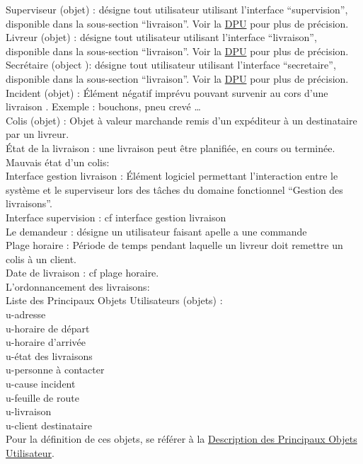 \documentclass{report}
\begin{document}
\begin{appendices}
Superviseur (objet) : désigne tout utilisateur utilisant l’interface “supervision”, disponible dans la sous-section “livraison”. Voir la \hyperlink{labDPUSup}{DPU} pour plus de précision.\\

Livreur (objet) : désigne tout utilisateur utilisant l’interface “livraison”, disponible dans la sous-section “livraison”. Voir la \hyperlink{labDPULiv}{DPU} pour plus de précision.\\

Secrétaire (object ): désigne tout utilisateur utilisant l’interface “secretaire”, disponible dans la sous-section “livraison”. Voir la \hyperlink{labDPUSec}{DPU} pour plus de précision.\\

Incident (objet) : Élément négatif imprévu pouvant survenir au cors d’une livraison . Exemple : bouchons, pneu crevé …\\

Colis (objet) : Objet à valeur marchande remis d’un expéditeur à un destinataire par un livreur.\\

État de la livraison : une livraison peut être planifiée, en cours ou terminée.\\

Mauvais état d’un colis: \\

Interface gestion livraison : Élément logiciel permettant l’interaction entre le système et le superviseur lors des tâches du domaine fonctionnel “Gestion des livraisons”.\\

Interface supervision : cf interface gestion livraison\\

Le demandeur : désigne un utilisateur faisant apelle a une commande \\

Plage horaire : Période de temps pendant laquelle un livreur doit remettre un colis à un client.\\

Date de livraison : cf plage horaire.\\

L’ordonnancement des livraisons:\\

Liste des Principaux Objets Utilisateurs (objets) :\\
u-adresse \\
u-horaire de départ\\
u-horaire d’arrivée\\
u-état des livraisons\\
u-personne à contacter\\
u-cause incident\\
u-feuille de route\\
u-livraison\\
u-client destinataire\\
Pour la définition de ces objets, se référer à la \hyperlink{labDPOU}{Description des Principaux Objets Utilisateur}.\\


\end{appendices}
\end{document}
